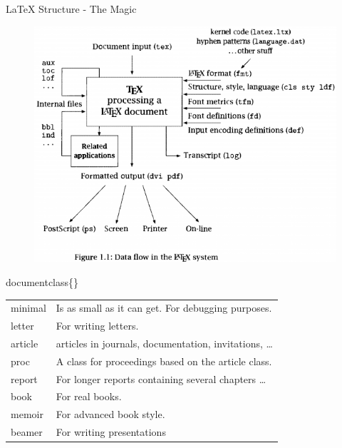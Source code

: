 \documentclass[10pt,times]{beamer}
\begin{document}
\begin{frame}{LaTeX Structure - The Magic}
\begin{figure}
\centering
\includegraphics[height=0.95\textheight]{figs/LaTeX.png}
\end{figure}
\end{frame}


\begin{frame}{\bs documentclass\{\}}

\begin{table}
\renewcommand{\arraystretch}{1.5}
\begin{tabularx}{0.9\textwidth}{l X}
\toprule
minimal & Is as small as it can get. For debugging purposes.\\ 
letter & For writing letters. \\ 
article & articles in journals, documentation, invitations, \dots \\ 
proc & A class for proceedings based on the article class.\\ 
report & For longer reports containing several chapters \dots \\
book & For real books.\\
memoir & For advanced book style. \\
beamer& For writing presentations \\ \bottomrule
\end{tabularx}
\end{table}
\end{frame}
\end{document}
